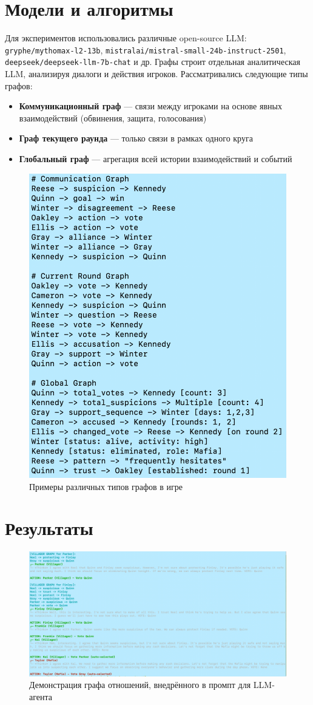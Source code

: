 \documentclass[a4paper,12pt]{article}
\begin{document}
\section{Модели и алгоритмы}
Для экспериментов использовались различные open-source LLM: \texttt{gryphe/mythomax-l2-13b}, \texttt{mistralai/mistral-small-24b-instruct-2501}, \texttt{deepseek/deepseek-llm-7b-chat} и др. Графы строит отдельная аналитическая LLM, анализируя диалоги и действия игроков. Рассматривались следующие типы графов:

\begin{itemize}
    \item \textbf{Коммуникационный граф} — связи между игроками на основе явных взаимодействий (обвинения, защита, голосования)
    \item \textbf{Граф текущего раунда} — только связи в рамках одного круга
    \item \textbf{Глобальный граф} — агрегация всей истории взаимодействий и событий
\end{itemize}

\begin{figure}[h!]
    \centering
    \includegraphics[width=0.6\linewidth]{graph_types.png}
    \caption{Примеры различных типов графов в игре}
    \label{fig:graphs}
\end{figure}

\section{Результаты}

\begin{figure}[h!]
    \centering
    \includegraphics[width=0.8\linewidth]{demonstration.png}
    \caption{Демонстрация графа отношений, внедрённого в промпт для LLM-агента}
    \label{fig:demo}
\end{figure}
\end{document}
